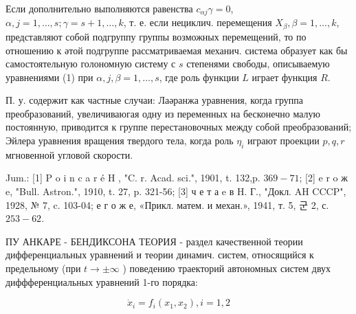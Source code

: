 \documentclass[10pt]{article}
\begin{document}
Если дополнительно выполняются равенства $c_{\alpha j} \gamma=0$, $\alpha, j=1, \ldots, s ; \gamma=s+1, \ldots, k$, т. е. если нециклич. перемещения $X_{\beta}, \beta=1, \ldots, k$, представляют собой подгруппу группы возможных перемещений, то по отношению к әтой подгруппе рассматриваемая механич. система образует как бы самостоятельную голономную систему с $s$ степенями свободы, описываемую уравнениями (1) при $\alpha, j, \beta=1, \ldots, s$, где роль функции $L$ играет функция $R$.



П. у. содержит как частные случаи: Лаәранжа уравнения, когда группа преобразований, увеличиваюгая одну из переменных на бесконечно малую постоянную, приводится к группе перестановочных между собой преобразований; Эйлера уравнения вращения твердого тела, когда роль $\eta_{i}$ играют проекции $p, q, r$ мгновенной угловой скорости.



Jum.: [1] P o i n c a r é H , "C. r. Acad. sci.", 1901, t. 132,p. $369-71$; [2] e r o ж e, "Bull. Astron.", 1910, t. 27, p. 321-56; [3] ч е т а e в H. Г., "Докл. AH CCCP", 1928, № 7, c. 103-04; е г о ж е, «Прикл. матем. и механ.», 1941, т. 5, 군 2, с. $253-62$.



ПУ АНКАРЕ - БЕНДИКСОНА ТЕОРИЯ - раздел качественной теории дифференциальных уравнений и теории динамич. систем, относящийся к предельному (при $t \rightarrow \pm \infty$ ) поведению траекторий автономных систем двух диффференциальных уравнений 1-го порядка:



\[

\dot{x}_{i}=f_{i}\left(x_{1}, x_{2}\right), i=1,2

\]
\end{document}
